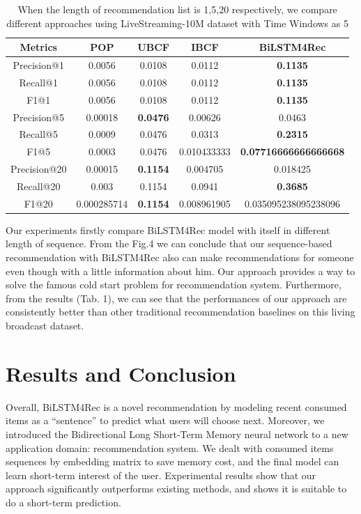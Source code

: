 \documentclass[runningheads]{llncs}
\begin{document}
\begin{table}[htbp]
\begin{center}
\begin{tabular}{|c|c|c|c|c|}
\hline

\textbf{Metrics} & \textbf{POP}& \textbf{UBCF}& \textbf{IBCF}& \textbf{BiLSTM4Rec} \\
\hline
Precision@1& 0.0056& 0.0108 & 0.0112 & \textbf{0.1135} \\
\hline
Recall@1& 0.0056& 0.0108 & 0.0112 & \textbf{0.1135}\\
\hline
F1@1& 0.0056& 0.0108 & 0.0112 & \textbf{0.1135}\\
\hline
Precision@5& 0.00018& \textbf{0.0476} & 0.00626 & 0.0463\\
\hline
Recall@5& 0.0009& 0.0476 & 0.0313 & \textbf{0.2315}\\
\hline
F1@5& 0.0003& 0.0476 & 0.010433333 & \textbf{0.07716666666666668}\\
\hline
Precision@20& 0.00015& \textbf{0.1154} & 0.004705 & 0.018425\\
\hline
Recall@20& 0.003& 0.1154 & 0.0941 & \textbf{0.3685}\\
\hline
F1@20& 0.000285714& \textbf{0.1154} & 0.008961905 & 0.035095238095238096\\
\hline
\end{tabular}
\label{tab1}
\end{center}
\caption{When the length of recommendation list is 1,5,20 respectively, we compare different approaches using LiveStreaming-10M dataset with Time Windows as 5}
\end{table}

Our experiments firstly compare BiLSTM4Rec model with itself in different length of sequence. From the Fig.4 we can conclude that our sequence-based recommendation with BiLSTM4Rec also can make recommendations for someone even though with a little information about him. Our approach provides a way to solve the famous cold start problem for recommendation system. Furthermore, from the results (Tab. 1), we can see that the performances of our approach are consistently better than other traditional recommendation baselines on this living broadcast dataset.

\section{Results and Conclusion}

Overall, BiLSTM4Rec is a novel recommendation by modeling recent consumed items as a “sentence” to predict what users will choose next. Moreover, we introduced the Bidirectional Long Short-Term Memory neural network to a new application domain: recommendation system. We dealt with consumed items sequences by embedding matrix to save memory cost,  and the final model can learn short-term interest of the user. Experimental results show that our approach significantly outperforms existing methods, and shows it is suitable to do a short-term prediction. 
\end{document}
